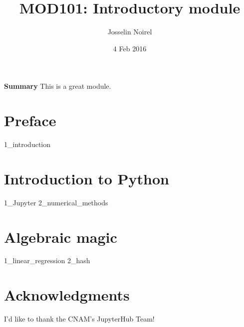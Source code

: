 \documentclass[oneside]{book}
\title  {MOD101: Introductory module}
\author {Josselin Noirel}
\date   {4 Feb 2016}
\begin{document}
\frontmatter

\maketitle

\begin{trivlist}
\item \textbf{Summary} This is a great module.
\end{trivlist}

\tableofcontents

\clearpage

\chapter{Preface}

  {1_introduction}

\mainmatter

\chapter{Introduction to Python}

  {1_Jupyter}
  {2_numerical_methods}

\chapter{Algebraic magic}

  {1_linear_regression}
  {2_hash}

\backmatter

\chapter{Acknowledgments}

I'd like to thank the CNAM's JupyterHub Team!
\end{document}
